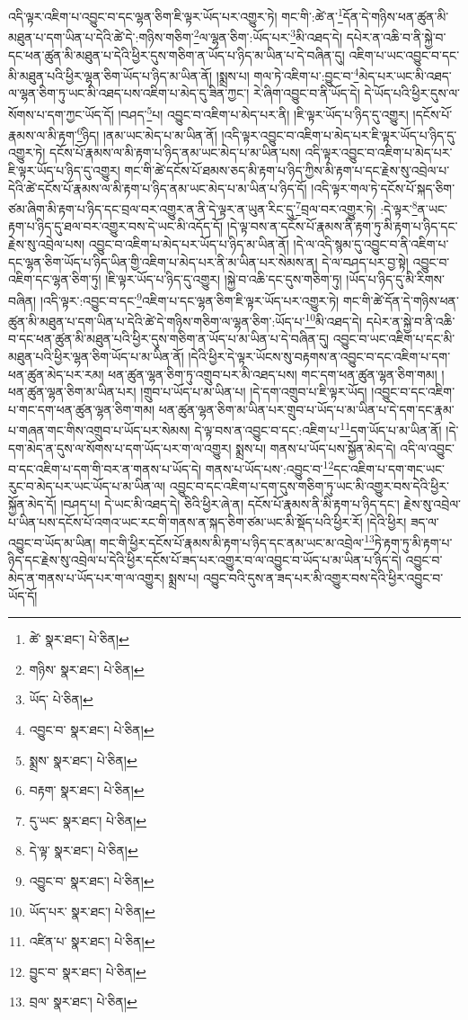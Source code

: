 འདི་ལྟར་འཇིག་པ་འབྱུང་བ་དང་ལྷན་ཅིག་ཇི་ལྟར་ཡོད་པར་འགྱུར་ཏེ། གང་གི་:ཚེ་ན་\footnote{ཚེ་  སྣར་ཐང་།  པེ་ཅིན། }དོན་དེ་གཉིས་ཕན་ཚུན་མི་མཐུན་པ་དག་ཡིན་པ་དེའི་ཚེ་དེ་:གཉིས་གཅིག་\footnote{གཉིས་  སྣར་ཐང་།  པེ་ཅིན། }ལ་ལྷན་ཅིག་:ཡོད་པར་\footnote{ཡོད་  པེ་ཅིན། }མི་འཐད་དེ། དཔེར་ན་འཆི་བ་ནི་སྐྱེ་བ་དང་ཕན་ཚུན་མི་མཐུན་པ་དེའི་ཕྱིར་དུས་གཅིག་ན་ཡོད་པ་ཉིད་མ་ཡིན་པ་དེ་བཞིན་དུ། འཇིག་པ་ཡང་འབྱུང་བ་དང་མི་མཐུན་པའི་ཕྱིར་ལྷན་ཅིག་ཡོད་པ་ཉིད་མ་ཡིན་ནོ། །སྨྲས་པ། གལ་ཏེ་འཇིག་པ་:བྱུང་བ་\footnote{འབྱུང་བ་  སྣར་ཐང་།  པེ་ཅིན། }མེད་པར་ཡང་མི་འཐད་ལ་ལྷན་ཅིག་ཏུ་ཡང་མི་འཐད་པས་འཇིག་པ་མེད་དུ་ཟིན་ཀྱང་། རེ་ཞིག་འབྱུང་བ་ནི་ཡོད་དེ། དེ་ཡོད་པའི་ཕྱིར་དུས་ལ་སོགས་པ་དག་ཀྱང་ཡོད་དོ། །བཤད་\footnote{སྨྲས་  སྣར་ཐང་།  པེ་ཅིན། }པ། འབྱུང་བ་འཇིག་པ་མེད་པར་ནི། །ཇི་ལྟར་ཡོད་པ་ཉིད་དུ་འགྱུར། །དངོས་པོ་རྣམས་ལ་མི་རྟག་\footnote{བརྟག་  སྣར་ཐང་།  པེ་ཅིན། }ཉིད། །ནམ་ཡང་མེད་པ་མ་ཡིན་ནོ། །འདི་ལྟར་འབྱུང་བ་འཇིག་པ་མེད་པར་ཇི་ལྟར་ཡོད་པ་ཉིད་དུ་འགྱུར་ཏེ། དངོས་པོ་རྣམས་ལ་མི་རྟག་པ་ཉིད་ནམ་ཡང་མེད་པ་མ་ཡིན་པས། འདི་ལྟར་འབྱུང་བ་འཇིག་པ་མེད་པར་ཇི་ལྟར་ཡོད་པ་ཉིད་དུ་འགྱུར། གང་གི་ཚེ་དངོས་པོ་ཐམས་ཅད་མི་རྟག་པ་ཉིད་ཀྱིས་མི་རྟག་པ་དང་རྗེས་སུ་འབྲེལ་པ་དེའི་ཚེ་དངོས་པོ་རྣམས་ལ་མི་རྟག་པ་ཉིད་ནམ་ཡང་མེད་པ་མ་ཡིན་པ་ཉིད་དོ། །འདི་ལྟར་གལ་ཏེ་དངོས་པོ་སྐད་ཅིག་ཙམ་ཞིག་མི་རྟག་པ་ཉིད་དང་བྲལ་བར་འགྱུར་ན་ནི་དེ་ལྟར་ན་ཡུན་རིང་དུ་\footnote{དུ་ཡང་  སྣར་ཐང་།  པེ་ཅིན། }བྲལ་བར་འགྱུར་ཏེ། :དེ་ལྟར་\footnote{དེ་ལྟ་  སྣར་ཐང་།  པེ་ཅིན། }ན་ཡང་རྟག་པ་ཉིད་དུ་ཐལ་བར་འགྱུར་བས་དེ་ཡང་མི་འདོད་དོ། །དེ་ལྟ་བས་ན་དངོས་པོ་རྣམས་ནི་རྟག་ཏུ་མི་རྟག་པ་ཉིད་དང་རྗེས་སུ་འབྲེལ་པས། འབྱུང་བ་འཇིག་པ་མེད་པར་ཡོད་པ་ཉིད་མ་ཡིན་ནོ། །དེ་ལ་འདི་སྙམ་དུ་འབྱུང་བ་ནི་འཇིག་པ་དང་ལྷན་ཅིག་ཡོད་པ་ཉིད་ཡིན་གྱི་འཇིག་པ་མེད་པར་ནི་མ་ཡིན་པར་སེམས་ན། དེ་ལ་བཤད་པར་བྱ་སྟེ། འབྱུང་བ་འཇིག་དང་ལྷན་ཅིག་ཏུ། །ཇི་ལྟར་ཡོད་པ་ཉིད་དུ་འགྱུར། །སྐྱེ་བ་འཆི་དང་དུས་གཅིག་ཏུ། །ཡོད་པ་ཉིད་དུ་མི་རིགས་བཞིན། །འདི་ལྟར་:འབྱུང་བ་དང་\footnote{འབྱུང་བ་  སྣར་ཐང་།  པེ་ཅིན། }འཇིག་པ་དང་ལྷན་ཅིག་ཇི་ལྟར་ཡོད་པར་འགྱུར་ཏེ། གང་གི་ཚེ་དོན་དེ་གཉིས་ཕན་ཚུན་མི་མཐུན་པ་དག་ཡིན་པ་དེའི་ཚེ་དེ་གཉིས་གཅིག་ལ་ལྷན་ཅིག་:ཡོད་པ་\footnote{ཡོད་པར་  སྣར་ཐང་།  པེ་ཅིན། }མི་འཐད་དེ། དཔེར་ན་སྐྱེ་བ་ནི་འཆི་བ་དང་ཕན་ཚུན་མི་མཐུན་པའི་ཕྱིར་དུས་གཅིག་ན་ཡོད་པ་མ་ཡིན་པ་དེ་བཞིན་དུ། འབྱུང་བ་ཡང་འཇིག་པ་དང་མི་མཐུན་པའི་ཕྱིར་ལྷན་ཅིག་ཡོད་པ་མ་ཡིན་ནོ། །དེའི་ཕྱིར་དེ་ལྟར་ཡོངས་སུ་བརྟགས་ན་འབྱུང་བ་དང་འཇིག་པ་དག་ཕན་ཚུན་མེད་པར་རམ། ཕན་ཚུན་ལྷན་ཅིག་ཏུ་འགྲུབ་པར་མི་འཐད་པས། གང་དག་ཕན་ཚུན་ལྷན་ཅིག་གམ། །ཕན་ཚུན་ལྷན་ཅིག་མ་ཡིན་པར། །གྲུབ་པ་ཡོད་པ་མ་ཡིན་པ། །དེ་དག་འགྲུབ་པ་ཇི་ལྟར་ཡོད། །འབྱུང་བ་དང་འཇིག་པ་གང་དག་ཕན་ཚུན་ལྷན་ཅིག་གམ། ཕན་ཚུན་ལྷན་ཅིག་མ་ཡིན་པར་གྲུབ་པ་ཡོད་པ་མ་ཡིན་པ་དེ་དག་དང་རྣམ་པ་གཞན་གང་གིས་འགྲུབ་པ་ཡོད་པར་སེམས། དེ་ལྟ་བས་ན་འབྱུང་བ་དང་:འཇིག་པ་\footnote{འཛིན་པ་  སྣར་ཐང་།  པེ་ཅིན། }དག་ཡོད་པ་མ་ཡིན་ནོ། །དེ་དག་མེད་ན་དུས་ལ་སོགས་པ་དག་ཡོད་པར་ག་ལ་འགྱུར། སྨྲས་པ། གནས་པ་ཡོད་པས་སྐྱོན་མེད་དེ། འདི་ལ་འབྱུང་བ་དང་འཇིག་པ་དག་གི་བར་ན་གནས་པ་ཡོད་དེ། གནས་པ་ཡོད་པས་:འབྱུང་བ་\footnote{བྱུང་བ་  སྣར་ཐང་།  པེ་ཅིན། }དང་འཇིག་པ་དག་གང་ཡང་རུང་བ་མེད་པར་ཡང་ཡོད་པ་མ་ཡིན་ལ། འབྱུང་བ་དང་འཇིག་པ་དག་དུས་གཅིག་ཏུ་ཡང་མི་འགྱུར་བས་དེའི་ཕྱིར་སྐྱོན་མེད་དོ། །བཤད་པ། དེ་ཡང་མི་འཐད་དེ། ཅིའི་ཕྱིར་ཞེ་ན། དངོས་པོ་རྣམས་ནི་མི་རྟག་པ་ཉིད་དང་། རྗེས་སུ་འབྲེལ་པ་ཡིན་པས་དངོས་པོ་འགའ་ཡང་རང་གི་གནས་ན་སྐད་ཅིག་ཙམ་ཡང་མི་སྡོད་པའི་ཕྱིར་རོ། །དེའི་ཕྱིར། ཟད་ལ་འབྱུང་བ་ཡོད་མ་ཡིན། གང་གི་ཕྱིར་དངོས་པོ་རྣམས་མི་རྟག་པ་ཉིད་དང་ནམ་ཡང་མ་འབྲེལ་\footnote{བྲལ་  སྣར་ཐང་།  པེ་ཅིན། }ཏེ་རྟག་ཏུ་མི་རྟག་པ་ཉིད་དང་རྗེས་སུ་འབྲེལ་པ་དེའི་ཕྱིར་དངོས་པོ་ཟད་པར་འགྱུར་བ་ལ་འབྱུང་བ་ཡོད་པ་མ་ཡིན་པ་ཉིད་དེ། འབྱུང་བ་མེད་ན་གནས་པ་ཡོད་པར་ག་ལ་འགྱུར། སྨྲས་པ། འབྱུང་བའི་དུས་ན་ཟད་པར་མི་འགྱུར་བས་དེའི་ཕྱིར་འབྱུང་བ་ཡོད་དོ། 
